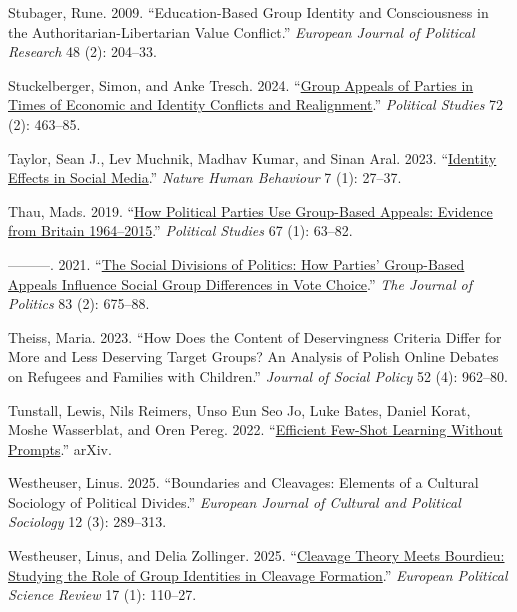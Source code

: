 \documentclass[12pt]{article}
\newlength{\cslhangindent}
\newenvironment{CSLReferences}[2]
  {\begin{list}{}{%
    \setlength{\itemindent}{0pt}
    \setlength{\leftmargin}{0pt}
    \setlength{\parsep}{0pt}
    \ifodd #1
      \setlength{\leftmargin}{\cslhangindent}
      \setlength{\itemindent}{-\cslhangindent}
    \fi
    \setlength{\itemsep}{#2\baselineskip}}}
  {\end{list}}
\begin{document}
\begin{CSLReferences}{1}{0}
Stubager, Rune. 2009. {``Education-Based Group Identity and Consciousness in the Authoritarian-Libertarian Value Conflict.''} \emph{European Journal of Political Research} 48 (2): 204--33.

Stuckelberger, Simon, and Anke Tresch. 2024. {``\href{https://doi.org/10.1177/00323217221123147}{Group Appeals of Parties in Times of Economic and Identity Conflicts and Realignment}.''} \emph{Political Studies} 72 (2): 463--85.

Taylor, Sean J., Lev Muchnik, Madhav Kumar, and Sinan Aral. 2023. {``\href{https://doi.org/10.1038/s41562-022-01459-8}{Identity Effects in Social Media}.''} \emph{Nature Human Behaviour} 7 (1): 27--37.

Thau, Mads. 2019. {``\href{https://doi.org/10.1177/0032321717744495}{How Political Parties Use Group-Based Appeals: Evidence from Britain 1964--2015}.''} \emph{Political Studies} 67 (1): 63--82.

---------. 2021. {``\href{https://doi.org/10.1086/710018}{The Social Divisions of Politics: How Parties' Group-Based Appeals Influence Social Group Differences in Vote Choice}.''} \emph{The Journal of Politics} 83 (2): 675--88.

Theiss, Maria. 2023. {``How Does the Content of Deservingness Criteria Differ for More and Less Deserving Target Groups? An Analysis of Polish Online Debates on Refugees and Families with Children.''} \emph{Journal of Social Policy} 52 (4): 962--80.

Tunstall, Lewis, Nils Reimers, Unso Eun Seo Jo, Luke Bates, Daniel Korat, Moshe Wasserblat, and Oren Pereg. 2022. {``\href{https://doi.org/10.48550/arXiv.2209.11055}{Efficient Few-Shot Learning Without Prompts}.''} {arXiv}.

Westheuser, Linus. 2025. {``Boundaries and Cleavages: Elements of a Cultural Sociology of Political Divides.''} \emph{European Journal of Cultural and Political Sociology} 12 (3): 289--313.

Westheuser, Linus, and Delia Zollinger. 2025. {``\href{https://doi.org/10.1017/S1755773924000249}{Cleavage Theory Meets Bourdieu: Studying the Role of Group Identities in Cleavage Formation}.''} \emph{European Political Science Review} 17 (1): 110--27.


\end{CSLReferences}
\end{document}

